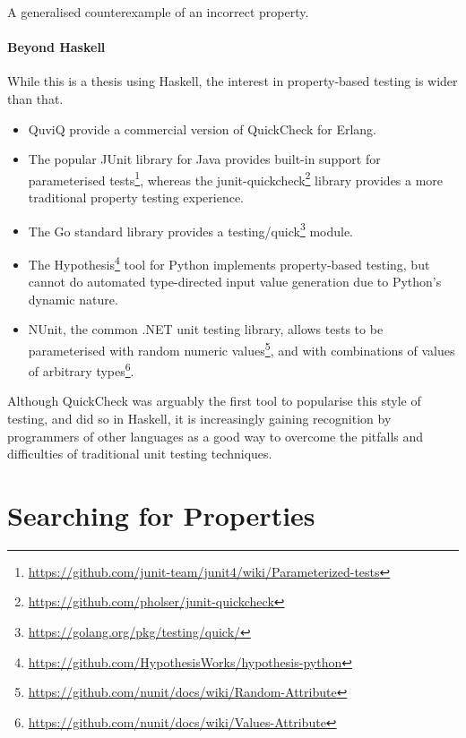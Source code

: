\begin{listing}
\centering
{}
\caption{A generalised counterexample of an incorrect property.}\label{lst:gencntr}
\end{listing}

\paragraph{Beyond Haskell}
While this is a thesis using Haskell, the interest in property-based testing is
wider than that.

\begin{itemize}
\item QuviQ provide a commercial version of QuickCheck for
  Erlang\cite{arts2006}.
\item The popular JUnit library for Java provides built-in support for parameterised
  tests\footnote{\url{https://github.com/junit-team/junit4/wiki/Parameterized-tests}},
  whereas the
  junit-quickcheck\footnote{\url{https://github.com/pholser/junit-quickcheck}}
  library provides a more traditional property testing experience.
\item The Go standard library provides a
  testing/quick\footnote{\url{https://golang.org/pkg/testing/quick/}} module.
\item The
  Hypothesis\footnote{\url{https://github.com/HypothesisWorks/hypothesis-python}}
  tool for Python implements property-based testing, but cannot do automated
  type-directed input value generation due to Python's dynamic nature.
\item NUnit, the common .NET unit testing library, allows tests to be
  parameterised with random numeric
  values\footnote{\url{https://github.com/nunit/docs/wiki/Random-Attribute}},
  and with combinations of values of arbitrary
  types\footnote{\url{https://github.com/nunit/docs/wiki/Values-Attribute}}.
\end{itemize}

Although QuickCheck was arguably the first tool to popularise this style of
testing, and did so in Haskell, it is increasingly gaining recognition by
programmers of other languages as a good way to overcome the pitfalls and
difficulties of traditional unit testing techniques.

\section{Searching for Properties}
\label{sec:property_testing-gen}

